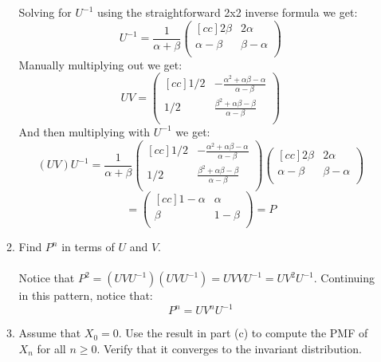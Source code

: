 \begin{enumerate}
\begin{enumerate}
        Solving for $U^{-1}$ using the straightforward 2x2 inverse formula we get:
        $$
        U^{-1}
        =
        \frac{1}{\alpha + \beta}
        \begin{pmatrix}[cc]
          2 \beta & 2 \alpha\\
          \alpha - \beta & \beta - \alpha\\
        \end{pmatrix}        
        $$
        Manually multiplying out we get:
        $$
        UV
        =
        \begin{pmatrix}[cc]
          1/2 & -\frac{\alpha^2 + \alpha \beta - \alpha}{\alpha - \beta}\\
          1/2 & \frac{\beta^2 + \alpha \beta - \beta}{\alpha - \beta}\\
        \end{pmatrix}        
       $$
       And then multiplying with $U^{-1}$ we get:
       $$
       (UV)U^{-1}
       =
       \frac{1}{\alpha + \beta}
       \begin{pmatrix}[cc]
         1/2 & -\frac{\alpha^2 + \alpha \beta - \alpha}{\alpha - \beta}\\
         1/2 & \frac{\beta^2 + \alpha \beta - \beta}{\alpha - \beta}\\
       \end{pmatrix}        
        \begin{pmatrix}[cc]
          2 \beta & 2 \alpha\\
          \alpha - \beta & \beta - \alpha\\
        \end{pmatrix}               
       $$
       $$
       =
       \begin{pmatrix}[cc]
         1 - \alpha & \alpha\\
         \beta & 1 - \beta\\
       \end{pmatrix}
       =
       P
       $$

     \item Find $P^n$ in terms of $U$ and $V$.\\\\

       Notice that $P^2 = (UVU^{-1})(UVU^{-1}) = UVVU^{-1} = UV^2U^{-1}$. Continuing in this pattern, notice that:
       $$P^n = UV^nU^{-1}$$

     \item Assume that $X_0 = 0$. Use the result in part (c) to compute the PMF of $X_n$ for all $n \geq 0$. Verify that it converges to the invariant distribution.\\\\


\end{enumerate}
\end{enumerate}
